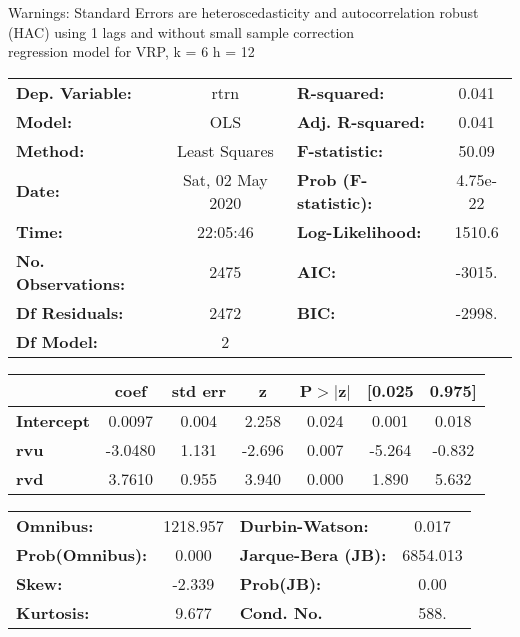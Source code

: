 Warnings: \newline
 [1] Standard Errors are heteroscedasticity and autocorrelation robust (HAC) using 1 lags and without small sample correction\\ 

regression model for VRP, k = 6 h = 12\begin{center}
\begin{tabular}{lclc}
\toprule
\textbf{Dep. Variable:}    &       rtrn       & \textbf{  R-squared:         } &     0.041   \\
\textbf{Model:}            &       OLS        & \textbf{  Adj. R-squared:    } &     0.041   \\
\textbf{Method:}           &  Least Squares   & \textbf{  F-statistic:       } &     50.09   \\
\textbf{Date:}             & Sat, 02 May 2020 & \textbf{  Prob (F-statistic):} &  4.75e-22   \\
\textbf{Time:}             &     22:05:46     & \textbf{  Log-Likelihood:    } &    1510.6   \\
\textbf{No. Observations:} &        2475      & \textbf{  AIC:               } &    -3015.   \\
\textbf{Df Residuals:}     &        2472      & \textbf{  BIC:               } &    -2998.   \\
\textbf{Df Model:}         &           2      & \textbf{                     } &             \\
\bottomrule
\end{tabular}
\begin{tabular}{lcccccc}
                   & \textbf{coef} & \textbf{std err} & \textbf{z} & \textbf{P$> |$z$|$} & \textbf{[0.025} & \textbf{0.975]}  \\
\midrule
\textbf{Intercept} &       0.0097  &        0.004     &     2.258  &         0.024        &        0.001    &        0.018     \\
\textbf{rvu}       &      -3.0480  &        1.131     &    -2.696  &         0.007        &       -5.264    &       -0.832     \\
\textbf{rvd}       &       3.7610  &        0.955     &     3.940  &         0.000        &        1.890    &        5.632     \\
\bottomrule
\end{tabular}
\begin{tabular}{lclc}
\textbf{Omnibus:}       & 1218.957 & \textbf{  Durbin-Watson:     } &    0.017  \\
\textbf{Prob(Omnibus):} &   0.000  & \textbf{  Jarque-Bera (JB):  } & 6854.013  \\
\textbf{Skew:}          &  -2.339  & \textbf{  Prob(JB):          } &     0.00  \\
\textbf{Kurtosis:}      &   9.677  & \textbf{  Cond. No.          } &     588.  \\
\bottomrule
\end{tabular}
\end{center}


